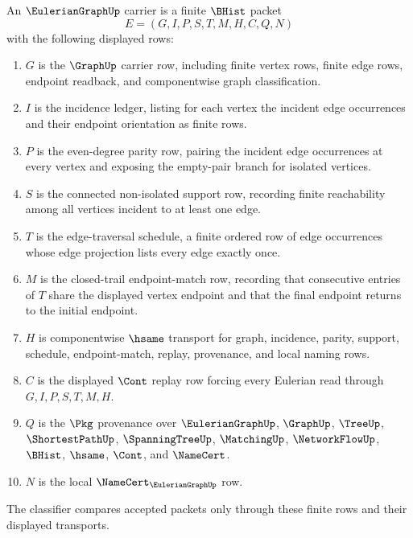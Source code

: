 \begin{definition}
\label{def:eulerian-graph-carrier}
An $\EulerianGraphUp$ carrier is a finite $\BHist$ packet
$$
E=(G,I,P,S,T,M,H,C,Q,N)
$$
with the following displayed rows:
\begin{enumerate}
\item $G$ is the $\GraphUp$ carrier row, including finite vertex rows, finite edge rows, endpoint readback, and componentwise graph classification.
\item $I$ is the incidence ledger, listing for each vertex the incident edge occurrences and their endpoint orientation as finite rows.
\item $P$ is the even-degree parity row, pairing the incident edge occurrences at every vertex and exposing the empty-pair branch for isolated vertices.
\item $S$ is the connected non-isolated support row, recording finite reachability among all vertices incident to at least one edge.
\item $T$ is the edge-traversal schedule, a finite ordered row of edge occurrences whose edge projection lists every edge exactly once.
\item $M$ is the closed-trail endpoint-match row, recording that consecutive entries of $T$ share the displayed vertex endpoint and that the final endpoint returns to the initial endpoint.
\item $H$ is componentwise $\hsame$ transport for graph, incidence, parity, support, schedule, endpoint-match, replay, provenance, and local naming rows.
\item $C$ is the displayed $\Cont$ replay row forcing every Eulerian read through $G,I,P,S,T,M,H$.
\item $Q$ is the $\Pkg$ provenance over $\EulerianGraphUp$, $\GraphUp$, $\TreeUp$, $\ShortestPathUp$, $\SpanningTreeUp$, $\MatchingUp$, $\NetworkFlowUp$, $\BHist$, $\hsame$, $\Cont$, and $\NameCert$.
\item $N$ is the local $\NameCert_{\EulerianGraphUp}$ row.
\end{enumerate}
The classifier compares accepted packets only through these finite rows and their displayed transports.
\end{definition}

